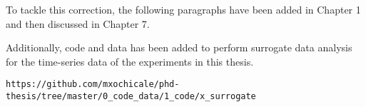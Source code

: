 \documentclass[12pt]{article}
\begin{document}



%
%



















To tackle this correction, the following paragraphs have been added 
in Chapter 1 and then discussed in Chapter 7. 

Additionally,
code and data has been added to perform surrogate data analysis
for the time-series data of the experiments in this thesis.
	\begin{verbatim}
https://github.com/mxochicale/phd-thesis/tree/master/0_code_data/1_code/x_surrogate
	\end{verbatim}



%
%
\end{document}

